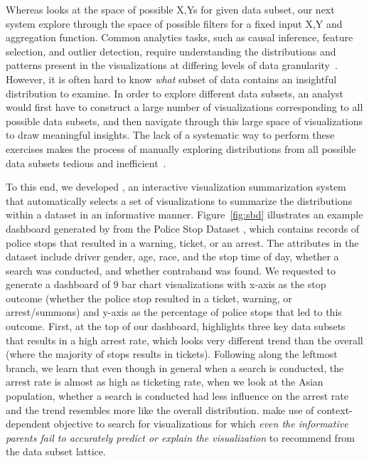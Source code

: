 \smallskip
{}
Whereas \seedb looks at the space of possible X,Ys 
for given data subset, 
our next system \sbd explore through the space of possible filters for a fixed input X,Y and aggregation function. Common analytics tasks, such as causal inference, feature selection, and outlier detection, require understanding the distributions and patterns present in the visualizations at differing levels of data granularity~\cite{Anand2015,Heer2012,Wu2013}. However, it is often hard to know \textit{what} subset of data contains an insightful distribution to examine. In order to explore different data subsets, an analyst would first have to construct a large number of visualizations corresponding to all possible data subsets, and then navigate through this large space of visualizations to draw meaningful insights.  The lack of a systematic way to perform these exercises makes the process of manually exploring distributions from all possible data subsets tedious and inefficient~\cite{Sarawagi1998,Sarawagi2000}.
\par To this end, we developed \sbd, an interactive visualization summarization system that automatically selects a set of visualizations to summarize the distributions within a dataset in an informative manner. Figure~\ref{fig:sbd} illustrates an example dashboard generated by \sbd from the Police Stop Dataset \cite{police}, which contains records of police stops that resulted in a warning, ticket, or an arrest. The attributes in the dataset include driver gender, age, race, and the stop time of day, whether a search was conducted, and whether contraband was found. We requested \sbd to generate a dashboard of 9 bar chart visualizations with x-axis as the stop outcome (whether the police stop resulted in a ticket, warning, or arrest/summons) and y-axis as the percentage of police stops that led to this outcome. First, at the top of our dashboard, \sbd highlights three key data subsets that results in a high arrest rate, which looks very different trend than the overall (where the majority of stops results in tickets). Following along the leftmost branch, we learn that even though in general when a search is conducted, the arrest rate is almost as high as ticketing rate, when we look at the Asian population, whether a search is conducted had less influence on the arrest rate and the trend resembles more like the overall distribution. \sbd make use of context-dependent objective to search for visualizations for which \emph{even the informative parents fail to accurately predict or explain the visualization} to recommend from the data subset lattice. 
